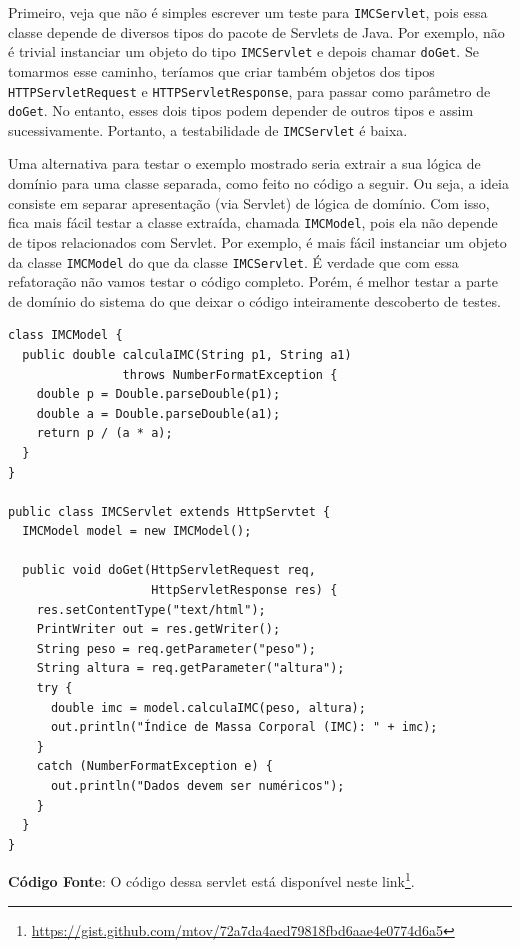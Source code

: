 \documentclass[
  11pt,
  twoside]{book}
\newcommand{\passthrough}[1]{#1}
\DeclareRobustCommand{\href}[2]{#2\footnote{\url{#1}}}
\begin{document}
Primeiro, veja que não é simples escrever um teste para
\passthrough{\lstinline!IMCServlet!}, pois essa classe depende de
diversos tipos do pacote de Servlets de Java. Por exemplo, não é trivial
instanciar um objeto do tipo \passthrough{\lstinline!IMCServlet!} e
depois chamar \passthrough{\lstinline!doGet!}. Se tomarmos esse caminho,
teríamos que criar também objetos dos tipos
\passthrough{\lstinline!HTTPServletRequest!} e
\passthrough{\lstinline!HTTPServletResponse!}, para passar como
parâmetro de \passthrough{\lstinline!doGet!}. No entanto, esses dois
tipos podem depender de outros tipos e assim sucessivamente. Portanto, a
testabilidade de \passthrough{\lstinline!IMCServlet!} é baixa.

Uma alternativa para testar o exemplo mostrado seria extrair a sua
lógica de domínio para uma classe separada, como feito no código a
seguir. Ou seja, a ideia consiste em separar apresentação (via Servlet)
de lógica de domínio. Com isso, fica mais fácil testar a classe
extraída, chamada \passthrough{\lstinline!IMCModel!}, pois ela não
depende de tipos relacionados com Servlet. Por exemplo, é mais fácil
instanciar um objeto da classe \passthrough{\lstinline!IMCModel!} do que
da classe \passthrough{\lstinline!IMCServlet!}. É verdade que com essa
refatoração não vamos testar o código completo. Porém, é melhor testar a
parte de domínio do sistema do que deixar o código inteiramente
descoberto de testes.

\begin{lstlisting}
class IMCModel {
  public double calculaIMC(String p1, String a1) 
                throws NumberFormatException {
    double p = Double.parseDouble(p1);
    double a = Double.parseDouble(a1);
    return p / (a * a);
  }
}

public class IMCServlet extends HttpServtet {
  IMCModel model = new IMCModel();

  public void doGet(HttpServletRequest req, 
                    HttpServletResponse res) {
    res.setContentType("text/html");
    PrintWriter out = res.getWriter();
    String peso = req.getParameter("peso");
    String altura = req.getParameter("altura");
    try {
      double imc = model.calculaIMC(peso, altura);
      out.println("Índice de Massa Corporal (IMC): " + imc);
    }
    catch (NumberFormatException e) {
      out.println("Dados devem ser numéricos");
    }
  }
}  
\end{lstlisting}

\textbf{Código Fonte}: O código dessa servlet está disponível neste
\href{https://gist.github.com/mtov/72a7da4aed79818fbd6aae4e0774d6a5}{link}.
\end{document}
